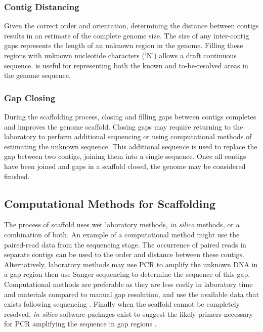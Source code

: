 \documentclass[10pt]{bmc_article}
\newenvironment{bmcformat}{\begin{raggedright}\baselineskip20pt\sloppy\setboolean{publ}{false}}{\end{raggedright}\baselineskip20pt\sloppy}
\begin{document}
\begin{bmcformat}
\subsubsection*{Contig Distancing} %

Given the correct order and orientation, determining the distance between
contigs results in an estimate of the complete genome size. The size of any
inter-contig gaps represents the length of an unknown region in the genome.
Filling these regions with unknown nucleotide characters (`N') allows a draft
continuous sequence.  is useful for representing
both the known and to-be-resolved areas in the genome sequence.

\subsubsection*{Gap Closing} %

During the scaffolding process, closing and filling gaps between contigs
completes and improves the genome scaffold. Closing gaps may require returning
to the laboratory to perform additional sequencing or using computational
methods of estimating the unknown sequence. This additional sequence is
used to replace the gap between two contigs, joining them into
a single sequence. Once all contigs have been joined and gaps in a scaffold
closed, the genome may be considered finished.

\subsection*{Computational Methods for Scaffolding} %

The process of  scaffold  uses wet laboratory methods, \emph{in silico}
methods, or a combination of both. An example of a computational method might
use the  paired-read data from the sequencing stage.
 The occurrence of paired reads in separate contigs can be used to
 the order and
distance between these contigs. Alternatively, laboratory methods may use PCR
to amplify the unknown DNA in a gap region then use 
Sanger sequencing to determine the sequence of this gap. Computational methods
are  preferable as they are less costly in laboratory time and
materials compared to manual gap resolution, and use the available data that
exists following sequencing \cite{nagarajan2010}. Finally when the scaffold
cannot be completely resolved, \emph{in silico} software packages exist to
suggest the likely primers necessary for PCR amplifying the sequence in gap
regions \cite{gordon2001}. \pb


\end{bmcformat}
\end{document}
